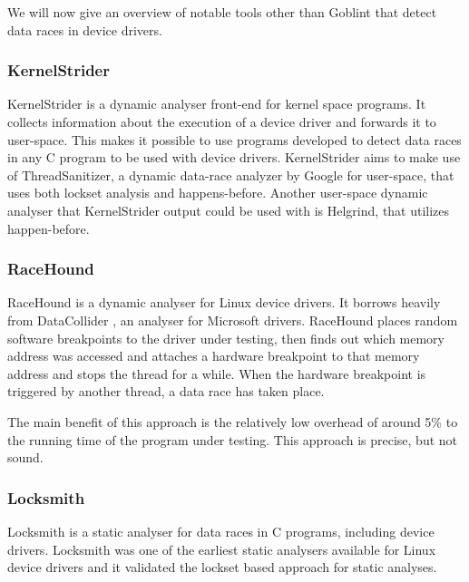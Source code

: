 \documentclass[..thesis.tex]{subfiles}
\begin{document}
We will now give an overview of notable tools other than Goblint that detect data races in device drivers.


\subsubsection{KernelStrider}

KernelStrider\cite{shatokhin_kernel} is a dynamic analyser front-end for kernel space programs. It collects information about the execution of a device driver and forwards it to user-space. This makes it possible to use programs developed to detect data races in any C program to be used with device drivers. KernelStrider aims to make use of ThreadSanitizer\cite{serebryany_threadsanitizer_2009}, a dynamic data-race analyzer by Google for user-space, that uses both lockset analysis and happens-before. Another user-space dynamic analyser that KernelStrider output could be used with is Helgrind,\cite{_helgrind,nethercote_valgrind_2007} that utilizes happen-before.


\subsubsection{RaceHound}

RaceHound\cite{komarov_implementation_2013} is a dynamic analyser for Linux device drivers. It borrows heavily from DataCollider \cite{erickson_effective_2010}, an analyser for Microsoft drivers. RaceHound places random software breakpoints to the driver under testing, then finds out which memory address was accessed and attaches a hardware breakpoint to that memory address and stops the thread for a while. When the hardware breakpoint is triggered by another thread, a data race has taken place.

The main benefit of this approach is the relatively low overhead of around 5\% to the running time of the program under testing. This approach is precise, but not sound.


\subsubsection{Locksmith}
Locksmith\cite{pratikakis_locksmith_2006} is a static analyser for data races in C programs, including device drivers. Locksmith was one of the earliest static analysers available for Linux device drivers and it validated the lockset based approach for static analyses. 
\end{document}
